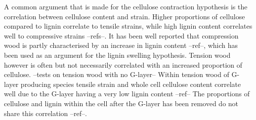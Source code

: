 A common argument that is made for the cellulose contraction hypothesis is the
correlation between cellulose content and strain. Higher proportions of
cellulose compared to lignin correlate to tensile strains, while high lignin
content correlates well to compressive strains --refs--. It has been well
reported that compression wood is partly characterised by an increase in
lignin content --ref--, which has been used as an argument for the lignin
swelling hypothesis. Tension wood however is often but not necessarily
correlated with an increased proportion of cellulose. --tests on tension wood
with no G-layer-- Within tension wood of G-layer producing species tensile
strain and whole cell cellulose content correlate well due to the G-layer
having a very low lignin content --ref-- The proportions of cellulose and lignin
within the cell after the G-layer has been removed do not share this correlation
--ref--.

